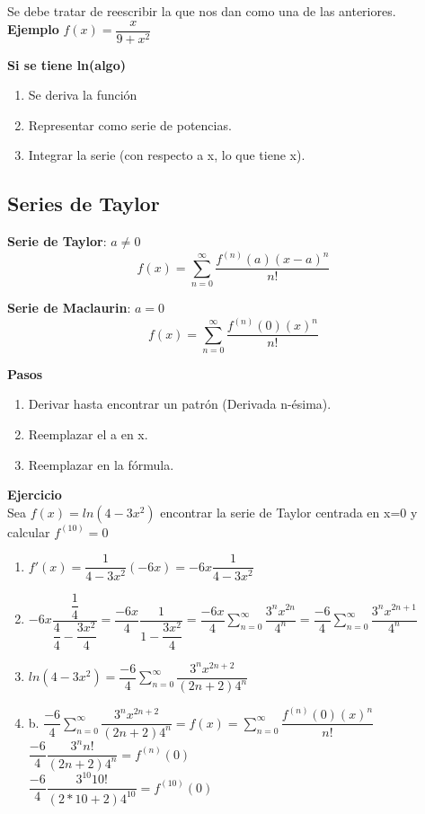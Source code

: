 Se debe tratar de reescribir la que nos dan como una de las anteriores.\\
\textbf{Ejemplo}
$f(x)=\dfrac{x}{9+x^2}$

\textbf{Si se tiene ln(algo)}
\begin{enumerate}
	\item Se deriva la función
	\item Representar como serie de potencias.
	\item Integrar la serie (con respecto a x, lo que tiene x).
\end{enumerate}

\subsection{Series de Taylor}
\textbf{Serie de Taylor}: $a\not=0$
$$f(x)=\sum_{n=0}^{\infty}\dfrac{f^{(n)}(a)(x-a)^n}{n!}$$

\textbf{Serie de Maclaurin}: $a=0$
$$f(x)=\sum_{n=0}^{\infty}\dfrac{f^{(n)}(0)(x)^n}{n!}$$

\textbf{Pasos}
\begin{enumerate}
	\item Derivar hasta encontrar un patrón (Derivada n-ésima).
	\item Reemplazar el a en x.
	\item Reemplazar en la fórmula. 
\end{enumerate}

\textbf{Ejercicio}\\
Sea $f(x)=ln(4-3x^2)$ encontrar la serie de Taylor centrada en x=0 y calcular $f^{(10)}=0$

\begin{enumerate}
	\item $f'(x)=\dfrac{1}{4-3x^2}(-6x)=-6x\dfrac{1}{4-3x^2}$
	\item $-6x\dfrac{\dfrac{1}{4}}{\dfrac{4}{4}-\dfrac{3x^2}{4}}=\dfrac{-6x}{4}\dfrac{1}{1-\dfrac{3x^2}{4}}=\dfrac{-6x}{4}\sum_{n=0}^{\infty}\dfrac{3^nx^{2n}}{4^n}=\dfrac{-6}{4}\sum_{n=0}^{\infty}\dfrac{3^nx^{2n+1}}{4^n}$
	\item $ln(4-3x^2)=\dfrac{-6}{4}\sum_{n=0}^{\infty}\dfrac{3^nx^{2n+2}}{(2n+2)4^n}$
	\item b. $\dfrac{-6}{4}\sum_{n=0}^{\infty}\dfrac{3^nx^{2n+2}}{(2n+2)4^n}=f(x)=\sum_{n=0}^{\infty}\dfrac{f^{(n)}(0)(x)^n}{n!}$\\
	$\dfrac{-6}{4}\dfrac{3^nn!}{(2n+2)4^n}=f^{(n)}(0)$\\
	$\dfrac{-6}{4}\dfrac{3^{10}10!}{(2*10+2)4^{10}}=f^{(10)}(0)$
\end{enumerate}

